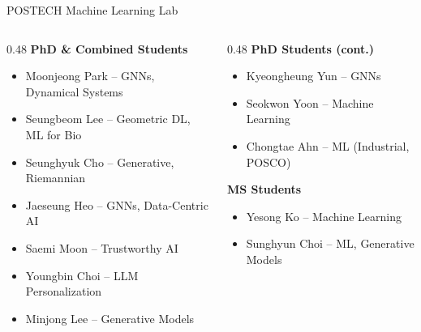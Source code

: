 \documentclass[aspectratio=169,11pt]{beamer}
\begin{document}
\begin{frame}{POSTECH Machine Learning Lab}
\small
\begin{columns}[T]
\begin{column}{0.48\textwidth}
  \textbf{PhD \& Combined Students}
  \begin{itemize}\setlength\itemsep{0pt}
    \item Moonjeong Park {\scriptsize -- GNNs, Dynamical Systems}
    \item Seungbeom Lee {\scriptsize -- Geometric DL, ML for Bio}
    \item Seunghyuk Cho {\scriptsize -- Generative, Riemannian}
    \item Jaeseung Heo {\scriptsize -- GNNs, Data-Centric AI}
    \item Saemi Moon {\scriptsize -- Trustworthy AI}
    \item Youngbin Choi {\scriptsize -- LLM Personalization}
    \item Minjong Lee {\scriptsize -- Generative Models}
  \end{itemize}
\end{column}
\begin{column}{0.48\textwidth}
  \textbf{PhD Students (cont.)}
  \begin{itemize}\setlength\itemsep{0pt}
    \item Kyeongheung Yun {\scriptsize -- GNNs}
    \item Seokwon Yoon {\scriptsize -- Machine Learning}
    \item Chongtae Ahn {\scriptsize -- ML (Industrial, POSCO)}
  \end{itemize}
  \vspace{6pt}
  \textbf{MS Students}
  \begin{itemize}\setlength\itemsep{0pt}
    \item Yesong Ko {\scriptsize -- Machine Learning}
    \item Sunghyun Choi {\scriptsize -- ML, Generative Models}
  \end{itemize}
\end{column}
\end{columns}
\end{frame}
\end{document}
